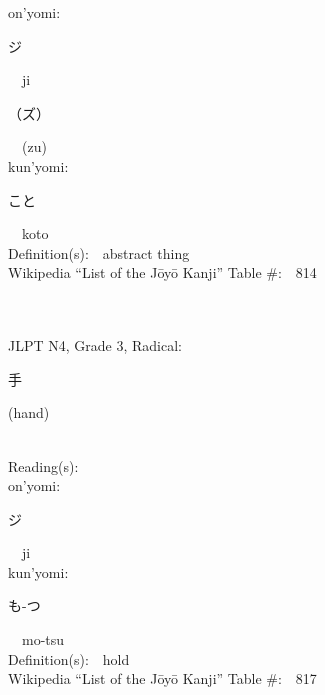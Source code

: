 \begin{multicols}{2}
{\hspace*{1em}}on'yomi:\ \ \\
{\hspace*{2em}}{\begin{CJK}{UTF8}{min} ジ \end{CJK}}\ \ ji\ \ \\
{\hspace*{2em}}{\begin{CJK}{UTF8}{min} （ズ） \end{CJK}}\ \ (zu)\ \ \\
{\hspace*{1em}}kun'yomi:\ \ \\
{\hspace*{2em}}{\begin{CJK}{UTF8}{min} こと \end{CJK}}\ \ koto\ \ \\
Definition(s):\ \ abstract thing \\
Wikipedia ``List of the J\=oy\=o Kanji'' Table \#:\ \ 814 \\
\ \ \\
{\fontsize{34pt}{40pt}  }\ \ \\  %
{JLPT N4, Grade 3, Radical:\ \ {\begin{CJK}{UTF8}{min} 手 \end{CJK}} (hand) } \\
Reading(s):\ \ \\
{\hspace*{1em}}on'yomi:\ \ \\
{\hspace*{2em}}{\begin{CJK}{UTF8}{min} ジ \end{CJK}}\ \ ji\ \ \\
{\hspace*{1em}}kun'yomi:\ \ \\
{\hspace*{2em}}{\begin{CJK}{UTF8}{min} も-つ \end{CJK}}\ \ mo-tsu\ \ \\
Definition(s):\ \ hold \\
Wikipedia ``List of the J\=oy\=o Kanji'' Table \#:\ \ 817 \\
\ \ \\
{\fontsize{34pt}{40pt}  }\ \ \\  %

\end{multicols}
